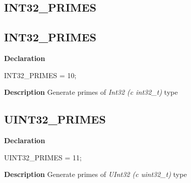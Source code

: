 \documentclass{report}
\newif\ifpdf
\begin{document}
\subsection*{\large{\textbf{INT32{\_}PRIMES}}\normalsize\hspace{1ex}\hrulefill}
\else
\subsection*{INT32{\_}PRIMES}
\fi
\label{primesieve-INT32_PRIMES}
\begin{list}{}{
\setlength{\itemindent}{0cm}
\setlength{\listparindent}{0cm}
\setlength{\leftmargin}{\evensidemargin}
\addtolength{\leftmargin}{\tmplength}
\settowidth{\labelsep}{X}
\addtolength{\leftmargin}{\labelsep}
\setlength{\labelwidth}{\tmplength}
}
\item[\textbf{Declaration}\hfill]
\ifpdf
\begin{flushleft}
\fi
\begin{ttfamily}
INT32{\_}PRIMES = 10;\end{ttfamily}

\ifpdf
\end{flushleft}
\fi

\par
\item[\textbf{Description}]
Generate primes of \textit{Int32 (c int32{\_}t)} type

\end{list}
\ifpdf
\subsection*{\large{\textbf{UINT32{\_}PRIMES}}\normalsize\hspace{1ex}\hrulefill}
\else
\subsection*{UINT32{\_}PRIMES}
\fi
\label{primesieve-UINT32_PRIMES}
\begin{list}{}{
\setlength{\itemindent}{0cm}
\setlength{\listparindent}{0cm}
\setlength{\leftmargin}{\evensidemargin}
\addtolength{\leftmargin}{\tmplength}
\settowidth{\labelsep}{X}
\addtolength{\leftmargin}{\labelsep}
\setlength{\labelwidth}{\tmplength}
}
\item[\textbf{Declaration}\hfill]
\ifpdf
\begin{flushleft}
\fi
\begin{ttfamily}
UINT32{\_}PRIMES = 11;\end{ttfamily}

\ifpdf
\end{flushleft}
\fi

\par
\item[\textbf{Description}]
Generate primes of \textit{UInt32 (c uint32{\_}t)} type

\end{list}
\ifpdf
\end{document}
